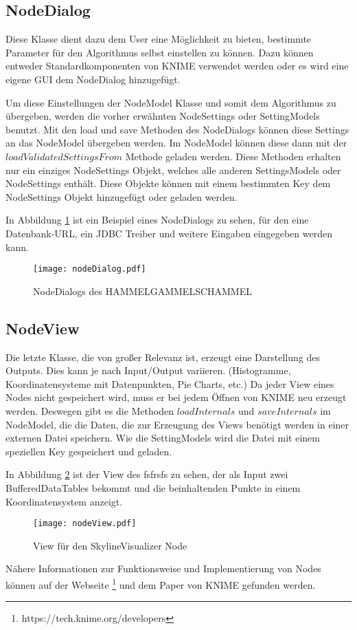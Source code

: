 \subsection{NodeDialog}
\label{ch:Analyse:sec:knime:subsec:nodeDialog}
Diese Klasse dient dazu dem User eine Möglichkeit zu bieten, bestimmte Parameter für den Algorithmus selbst einstellen zu können. 
Dazu können entweder Standardkomponenten von KNIME verwendet werden oder es wird eine eigene GUI dem NodeDialog hinzugefügt.

Um diese Einstellungen der NodeModel Klasse und somit dem Algorithmus zu übergeben, werden die vorher erwähnten NodeSettings oder SettingModels benutzt. Mit den load und save Methoden des NodeDialogs können diese Settings an das NodeModel übergeben werden. Im NodeModel können diese dann mit der $loadValidatedSettingsFrom$ Methode geladen werden. Diese Methoden erhalten nur ein einziges NodeSettings Objekt, welches alle anderen SettingsModels oder NodeSettings enthält. Diese Objekte können mit einem bestimmten Key dem NodeSettings Objekt hinzugefügt oder geladen werden.

In Abbildung \ref{img:nodeDialog} ist ein Beispiel eines NodeDialogs zu sehen, für den eine Datenbank-URL, ein JDBC Treiber und weitere Eingaben eingegeben werden kann.

\begin{figure}[H]
	\centering
	\texttt{[image: nodeDialog.pdf]}
	\caption{NodeDialogs des HAMMELGAMMELSCHAMMEL}
	\label{img:nodeDialog}
\end{figure}

\subsection{NodeView}
\label{ch:Analyse:sec:knime:subsec:nodeView}
Die letzte Klasse, die von großer Relevanz ist, erzeugt eine Darstellung des Outputs. Dies kann je nach Input/Output variieren. (Histogramme, Koordinatensysteme mit Datenpunkten, Pie Charts, etc.)
Da jeder View eines Nodes nicht gespeichert wird, muss er bei jedem Öffnen von KNIME neu erzeugt werden.
Deswegen gibt es die Methoden $loadInternals$ und $saveInternals$ im NodeModel, die die Daten, die zur Erzeugung des Views benötigt werden in einer externen Datei speichern. Wie die SettingModels wird die Datei mit einem speziellen Key gespeichert und geladen. 

In Abbildung \ref{img:nodeView} ist der View des fsfrsfs zu sehen, der als Input zwei BufferedDataTables bekommt und die beinhaltenden Punkte in einem Koordinatensystem anzeigt. 

\begin{figure}
	\centering
	\texttt{[image: nodeView.pdf]}
	\caption{View für den SkylineVisualizer Node}
	\label{img:nodeView}
\end{figure}

Nähere Informationen zur Funktionsweise und Implementierung von Nodes können auf der Webseite \footnote{https://tech.knime.org/developers} und dem Paper \cite{BCDG+07} von KNIME gefunden werden.

